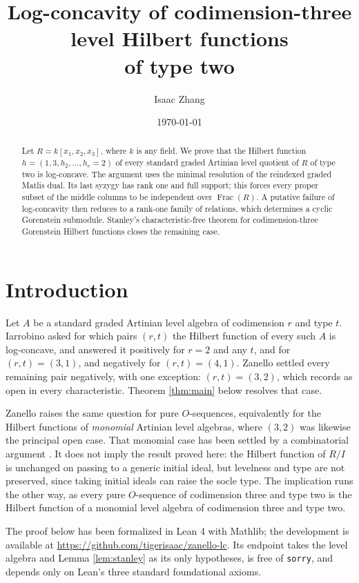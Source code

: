 \documentclass[11pt]{article}
\title{Log-concavity of codimension-three level Hilbert functions\\ of type two}
\author{Isaac Zhang}
\date{\today}
\theoremstyle{remark}
\newcommand{\Frac}{\operatorname{Frac}}
\begin{document}
\maketitle

\begin{abstract}
Let $R = k[x_1,x_2,x_3]$, where $k$ is any field. We prove that the Hilbert
function $h = (1, 3, h_2, \dots, h_e = 2)$ of every standard graded Artinian
level quotient of $R$ of type two is log-concave. The argument uses the
minimal resolution of the reindexed graded Matlis dual. Its last syzygy has
rank one and full support; this forces every proper subset of the middle
columns to be independent over $\Frac(R)$. A putative failure of
log-concavity then reduces to a rank-one family of relations, which
determines a cyclic Gorenstein submodule. Stanley's characteristic-free
theorem for codimension-three Gorenstein Hilbert functions closes the
remaining case.
\end{abstract}

\section*{Introduction}

Let $A$ be a standard graded Artinian level algebra of codimension $r$ and
type $t$. Iarrobino \cite{Iarrobino} asked for which pairs $(r,t)$ the
Hilbert function of every such $A$ is log-concave, and answered it
positively for $r = 2$ and any $t$, and for $(r,t) = (3,1)$, and negatively
for $(r,t) = (4,1)$. Zanello \cite{ZanelloLC} settled every remaining pair
negatively, with one exception: $(r,t) = (3,2)$, which \cite{ZanelloLC}
records as open in every characteristic. Theorem \ref{thm:main} below
resolves that case.

Zanello \cite{ZanelloLC} raises the same question for pure $O$-sequences,
equivalently for the Hilbert functions of \emph{monomial} Artinian level
algebras, where $(3,2)$ was likewise the principal open case. That monomial
case has been settled by a combinatorial argument \cite{AlphaProofNexus}. It
does not imply the result proved here: the Hilbert function of $R/I$ is
unchanged on passing to a generic initial ideal, but levelness and type are
not preserved, since taking initial ideals can raise the socle type. The
implication runs the other way, as every pure $O$-sequence of codimension
three and type two is the Hilbert function of a monomial level algebra of
codimension three and type two.

The proof below has been formalized in Lean 4 with Mathlib; the development
is available at \url{https://github.com/tigerisaac/zanello-lc}. Its endpoint
takes the level algebra and Lemma \ref{lem:stanley} as its only hypotheses,
is free of \texttt{sorry}, and depends only on Lean's three standard
foundational axioms.
\end{document}
